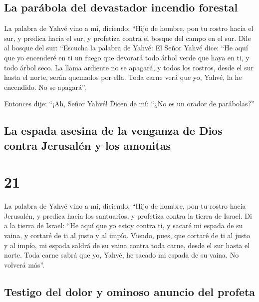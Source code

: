 \hypertarget{la-paruxe1bola-del-devastador-incendio-forestal}{%
\subsection{La parábola del devastador incendio
forestal}\label{la-paruxe1bola-del-devastador-incendio-forestal}}

 La palabra de Yahvé vino a mí, diciendo: 
``Hijo de hombre, pon tu rostro hacia el sur, y predica hacia el sur, y
profetiza contra el bosque del campo en el sur.  Dile al
bosque del sur: ``Escucha la palabra de Yahvé: El Señor Yahvé dice: ``He
aquí que yo encenderé en ti un fuego que devorará todo árbol verde que
haya en ti, y todo árbol seco. La llama ardiente no se apagará, y todos
los rostros, desde el sur hasta el norte, serán quemados por ella.
 Toda carne verá que yo, Yahvé, la he encendido. No se
apagará''.

 Entonces dije: ``¡Ah, Señor Yahvé! Dicen de mí: ``¿No es
un orador de parábolas?''

\hypertarget{la-espada-asesina-de-la-venganza-de-dios-contra-jerusaluxe9n-y-los-amonitas}{%
\subsection{La espada asesina de la venganza de Dios contra Jerusalén y
los
amonitas}\label{la-espada-asesina-de-la-venganza-de-dios-contra-jerusaluxe9n-y-los-amonitas}}

\hypertarget{section-20}{%
\section{21}\label{section-20}}

 La palabra de Yahvé vino a mí, diciendo: 
``Hijo de hombre, pon tu rostro hacia Jerusalén, y predica hacia los
santuarios, y profetiza contra la tierra de Israel.  Di a
la tierra de Israel: ``He aquí que yo estoy contra ti, y sacaré mi
espada de su vaina, y cortaré de ti al justo y al impío. 
Viendo, pues, que cortaré de ti al justo y al impío, mi espada saldrá de
su vaina contra toda carne, desde el sur hasta el norte. 
Toda carne sabrá que yo, Yahvé, he sacado mi espada de su vaina. No
volverá más''.

\hypertarget{testigo-del-dolor-y-ominoso-anuncio-del-profeta}{%
\subsection{Testigo del dolor y ominoso anuncio del
profeta}\label{testigo-del-dolor-y-ominoso-anuncio-del-profeta}}

